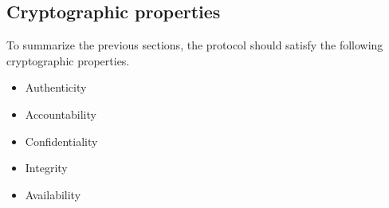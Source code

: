 \subsection{Cryptographic properties}
To summarize the previous sections, the protocol should satisfy the following cryptographic properties.
\begin{itemize}
  \item Authenticity
  \item Accountability
  \item Confidentiality
  \item Integrity
  \item \scriptsize Availability
\end{itemize}

